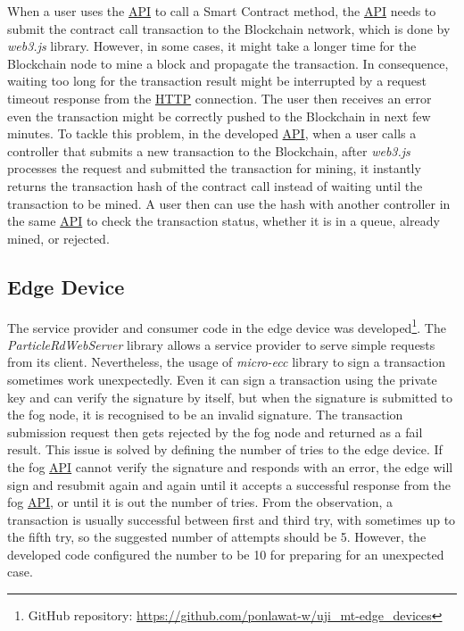 \npara When a user uses the \hyperref[Acronym-API]{API} to call a Smart Contract method, the \hyperref[Acronym-API]{API} needs to submit the contract call transaction to the Blockchain network, which is done by \textit{web3.js} library.
However, in some cases, it might take a longer time for the Blockchain node to mine a block and propagate the transaction.
In consequence, waiting too long for the transaction result might be interrupted by a request timeout response from the \hyperref[Acronym-HTTP]{HTTP} connection.
The user then receives an error even the transaction might be correctly pushed to the Blockchain in next few minutes.
To tackle this problem, in the developed \hyperref[Acronym-API]{API}, when a user calls a controller that submits a new transaction to the Blockchain, after \textit{web3.js} processes the request and submitted the transaction for mining, it instantly returns the transaction hash of the contract call instead of waiting until the transaction to be mined.
A user then can use the hash with another controller in the same \hyperref[Acronym-API]{API} to check the transaction status, whether it is in a queue, already mined, or rejected.

\subsection{Edge Device}

\npara The service provider and consumer code in the edge device was developed\footnote{GitHub repository: \url{https://github.com/ponlawat-w/uji_mt-edge_devices}}.
The \textit{ParticleRdWebServer} library allows a service provider to serve simple requests from its client.
Nevertheless, the usage of \textit{micro-ecc} library to sign a transaction sometimes work unexpectedly.
Even it can sign a transaction using the private key and can verify the signature by itself, but when the signature is submitted to the fog node, it is recognised to be an invalid signature.
The transaction submission request then gets rejected by the fog node and returned as a fail result.
This issue is solved by defining the number of tries to the edge device.
If the fog \hyperref[Acronym-API]{API} cannot verify the signature and responds with an error, the edge will sign and resubmit again and again until it accepts a successful response from the fog \hyperref[Acronym-API]{API}, or until it is out the number of tries.
From the observation, a transaction is usually successful between first and third try, with sometimes up to the fifth try, so the suggested number of attempts should be 5.
However, the developed code configured the number to be 10 for preparing for an unexpected case.

